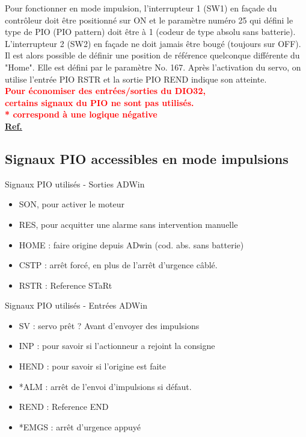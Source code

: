 \documentclass[a4paper,11pt]{beamer}
\begin{document}
\begin{frame}
\justifying
Pour fonctionner en mode impulsion, l'interrupteur 1 (SW1) en façade du contrôleur doit être positionné sur ON et le paramètre numéro 25 qui défini le type de PIO (PIO pattern) doit être à 1 (codeur de type absolu sans batterie). L'interrupteur 2 (SW2) en façade ne doit jamais être bougé (toujours sur OFF). Il est alors possible de définir une position de référence quelconque différente du "Home". Elle est défini par le paramètre No. 167. Après l'activation du servo, on utilise l'entrée PIO  RSTR et la sortie PIO REND indique son atteinte.\\
\vspace{0.5cm}
\centering
\textbf{\textcolor{red}{Pour économiser des entrées/sorties du DIO32,\\certains signaux du PIO ne sont pas utilisés.\\ * correspond à une logique négative}}\\
\vspace{0.25cm}
\textcolor{blue}{\textbf{\underline{\href{https://raw.githubusercontent.com/fbuloup/Interface_IAI/main/Documentation/SCON-CB_CGB(ME0340-8A).pdf\#page=243}{Ref.}}}}
\end{frame}

\subsection{Signaux PIO accessibles en mode impulsions}
\begin{frame}
\centering
	\begin{block}{Signaux PIO utilisés - Sorties ADWin}
	\begin{itemize}
		\item SON, pour activer le moteur
		\item RES, pour acquitter une alarme sans intervention manuelle
		\item HOME : faire origine depuis ADwin (cod. abs. sans batterie)
		\item CSTP : arrêt forcé, en plus de l'arrêt d'urgence câblé.
		\item RSTR : Reference STaRt
	\end{itemize}
	\end{block}
	\begin{block}{Signaux PIO utilisés - Entrées ADWin}
	\begin{itemize}
		\item SV : servo prêt ? Avant d'envoyer des impulsions
		\item INP : pour savoir si l'actionneur a rejoint la consigne
		\item HEND : pour savoir si l'origine est faite
		\item *ALM : arrêt de l'envoi d'impulsions si défaut.
		\item REND : Reference END 
		\item *EMGS : arrêt d'urgence appuyé
	\end{itemize}
	\end{block}
\end{frame}
\end{document}
